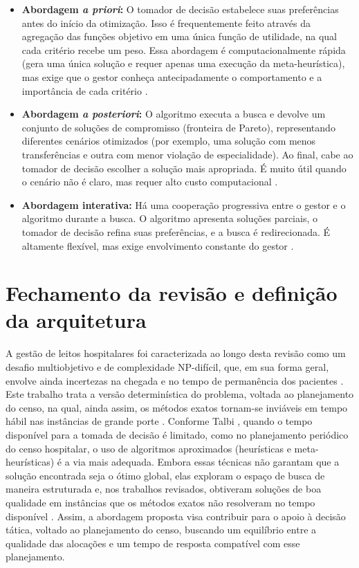 \begin{itemize}
    \item \textbf{Abordagem \textit{a priori}:} O tomador de decisão estabelece suas preferências antes do início da otimização. Isso é frequentemente feito através da agregação das funções objetivo em uma única função de utilidade, na qual cada critério recebe um peso. Essa abordagem é computacionalmente rápida (gera uma única solução e requer apenas uma execução da meta-heurística), mas exige que o gestor conheça antecipadamente o comportamento e a importância de cada critério \cite{talbi2009metaheuristics, schafer2023combining}.
    \item \textbf{Abordagem \textit{a posteriori}:} O algoritmo executa a busca e devolve um conjunto de soluções de compromisso (fronteira de Pareto), representando diferentes cenários otimizados (por exemplo, uma solução com menos transferências e outra com menor violação de especialidade). Ao final, cabe ao tomador de decisão escolher a solução mais apropriada. É muito útil quando o cenário não é claro, mas requer alto custo computacional \cite{talbi2009metaheuristics}.
    \item \textbf{Abordagem interativa:} Há uma cooperação progressiva entre o gestor e o algoritmo durante a busca. O algoritmo apresenta soluções parciais, o tomador de decisão refina suas preferências, e a busca é redirecionada. É altamente flexível, mas exige envolvimento constante do gestor \cite{talbi2009metaheuristics}.
\end{itemize}


\section{Fechamento da revisão e definição da arquitetura}

A gestão de leitos hospitalares foi caracterizada ao longo desta revisão como um desafio multiobjetivo e de complexidade NP-difícil, que, em sua forma geral, envolve ainda incertezas na chegada e no tempo de permanência dos pacientes \cite{ceschia2012modeling, demeester2010hybrid, he2019systematic}. Este trabalho trata a versão determinística do problema, voltada ao planejamento do censo, na qual, ainda assim, os métodos exatos tornam-se inviáveis em tempo hábil nas instâncias de grande porte \cite{ceschia2012modeling, demeester2010hybrid}. Conforme Talbi \cite{talbi2009metaheuristics}, quando o tempo disponível para a tomada de decisão é limitado, como no planejamento periódico do censo hospitalar, o uso de algoritmos aproximados (heurísticas e meta-heurísticas) é a via mais adequada. Embora essas técnicas não garantam que a solução encontrada seja o ótimo global, elas exploram o espaço de busca de maneira estruturada e, nos trabalhos revisados, obtiveram soluções de boa qualidade em instâncias que os métodos exatos não resolveram no tempo disponível \cite{ceschia2012modeling, demeester2010hybrid}. Assim, a abordagem proposta visa contribuir para o apoio à decisão tática, voltado ao planejamento do censo, buscando um equilíbrio entre a qualidade das alocações e um tempo de resposta compatível com esse planejamento.


